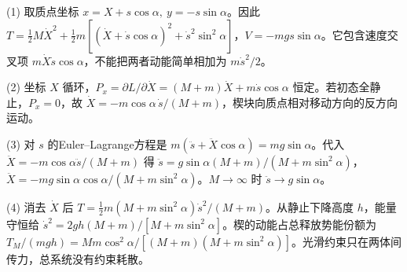 (1) 取质点坐标 \(x=X+s\cos\alpha,\ y=-s\sin\alpha\)。因此 \(T=\frac12M\dot X^2+\frac12m[(\dot X+\dot s\cos\alpha)^2+\dot s^2\sin^2\alpha]\)，\(V=-mg s\sin\alpha\)。它包含速度交叉项 \(m\dot X\dot s\cos\alpha\)，不能把两者动能简单相加为 \(m\dot s^2/2\)。

(2) 坐标 \(X\) 循环，\(P_x=\partial L/\partial\dot X=(M+m)\dot X+m\dot s\cos\alpha\) 恒定。若初态全静止，\(P_x=0\)，故 \(\boxed{\dot X=-m\cos\alpha\,\dot s/(M+m)}\)，楔块向质点相对移动方向的反方向运动。

(3) 对 \(s\) 的Euler–Lagrange方程是 \(m(\ddot s+\ddot X\cos\alpha)=mg\sin\alpha\)。代入 \(\ddot X=-m\cos\alpha\ddot s/(M+m)\) 得 \(\boxed{\ddot s=g\sin\alpha(M+m)/(M+m\sin^2\alpha)}\)，\(\ddot X=-mg\sin\alpha\cos\alpha/(M+m\sin^2\alpha)\)。\(M\to\infty\) 时 \(\ddot s\to g\sin\alpha\)。

(4) 消去 \(\dot X\) 后 \(T=\frac12m(M+m\sin^2\alpha)\dot s^2/(M+m)\)。从静止下降高度 \(h\)，能量守恒给 \(\dot s^2=2gh(M+m)/[M+m\sin^2\alpha]\)。楔的动能占总释放势能份额为 \(T_M/(mgh)=Mm\cos^2\alpha/[(M+m)(M+m\sin^2\alpha)]\)。光滑约束只在两体间传力，总系统没有约束耗散。
